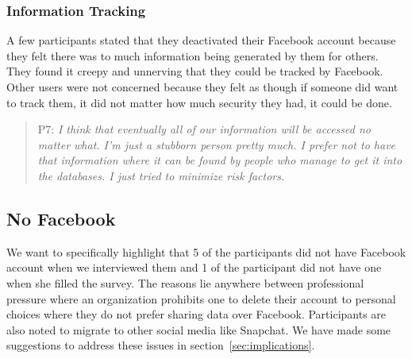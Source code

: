 \subsubsection{Information Tracking}
A few participants stated that they deactivated their Facebook account because they felt there was to much information being generated by them for others. They found it creepy and unnerving that they could be tracked by Facebook. Other users were not concerned because they felt as though if someone did want to track them, it did not matter how much security they had, it could be done. 
\begin{quote}
P7: \textit{I think that eventually all of our information will be accessed no matter what. I'm just a stubborn person pretty much. I prefer not to have that information where it can be found by people who manage to get it into the databases.  I just tried to minimize risk factors.}
\end{quote}

\subsection{No Facebook}
We want to specifically highlight that 5 of the participants did not have Facebook account when we interviewed them and 1 of the participant did not have one when she filled the survey. The reasons lie anywhere between professional pressure where an organization prohibits one to delete their account to personal choices where they do not prefer sharing data over Facebook. Participants are also noted to migrate to other social media like Snapchat. We have made some suggestions to address these issues in section~\ref{sec:implications}.